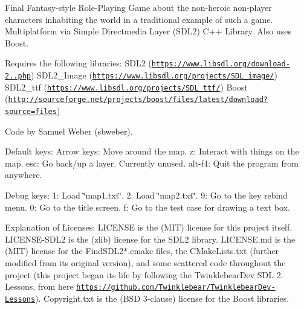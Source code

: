 Final Fantasy-\/style Role-\/\+Playing Game about the non-\/heroic non-\/player characters inhabiting the world in a traditional example of such a game. Multiplatform via Simple Directmedia Layer (S\+D\+L2) C++ Library. Also uses Boost.

Requires the following libraries\+: S\+D\+L2 (\href{https://www.libsdl.org/download-2.0.php}{\tt https\+://www.\+libsdl.\+org/download-\/2..\+php}) S\+D\+L2\+\_\+\+Image (\href{https://www.libsdl.org/projects/SDL_image/}{\tt https\+://www.\+libsdl.\+org/projects/\+S\+D\+L\+\_\+image/}) S\+D\+L2\+\_\+ttf (\href{https://www.libsdl.org/projects/SDL_ttf/}{\tt https\+://www.\+libsdl.\+org/projects/\+S\+D\+L\+\_\+ttf/}) Boost (\href{http://sourceforge.net/projects/boost/files/latest/download?source=files}{\tt http\+://sourceforge.\+net/projects/boost/files/latest/download?source=files})

Code by Samuel Weber (sbweber).

Default keys\+: Arrow keys\+: Move around the map. z\+: Interact with things on the map. esc\+: Go back/up a layer. Currently unused. alt-\/f4\+: Quit the program from anywhere.

Debug keys\+: 1\+: Load \char`\"{}map1.\+txt\char`\"{}. 2\+: Load \char`\"{}map2.\+txt\char`\"{}. 9\+: Go to the key rebind menu. 0\+: Go to the title screen. f\+: Go to the test case for drawing a text box.

Explanation of Licenses\+: L\+I\+C\+E\+N\+SE is the (M\+IT) license for this project itself. L\+I\+C\+E\+N\+S\+E-\/\+S\+D\+L2 is the (zlib) license for the S\+D\+L2 library. L\+I\+C\+E\+N\+S\+E.\+md is the (M\+IT) license for the Find\+S\+D\+L2$\ast$.cmake files, the C\+Make\+Lists.\+txt (further modified from its original version), and some scattered code throughout the project (this project began its life by following the Twinklebear\+Dev S\+DL 2. Lessons, from here \href{https://github.com/Twinklebear/TwinklebearDev-Lessons}{\tt https\+://github.\+com/\+Twinklebear/\+Twinklebear\+Dev-\/\+Lessons}). Copyright.\+txt is the (B\+SD 3-\/clause) license for the Boost libraries. 